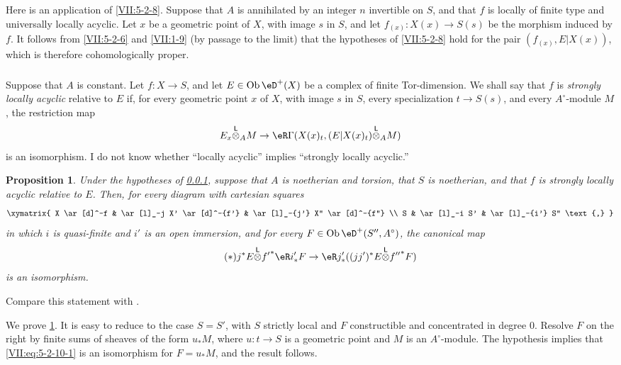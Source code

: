 \documentclass[12pt,oneside,english]{smfbook}
\DeclareMathOperator{\ob}{Ob}
\newcommand{\lotimes}{{\overset{\mathsf{L}}{\otimes}}}
\newtheorem{proposition}[subsubsection]{Proposition}
\begin{document}
Here is an application of \ref{VII:5-2-8}. Suppose that $A$ is annihilated by an integer $n$ invertible on $S$, and that $f$ is locally of finite type and universally locally acyclic. Let $x$ be a geometric point of $X$, with image $s$ in $S$, and let $f_{(x)}:X(x)\to S(s)$ be the morphism induced by $f$. It follows from \ref{VII:5-2-6} and \ref{VII:1-9} (by passage to the limit) that the hypotheses of \ref{VII:5-2-8} hold for the pair $(f_{(x)},E|X(x))$, which is therefore cohomologically proper.

\subsubsection{}\label{VII:5-2-9}

Suppose that $A$ is constant. Let $f:X\to S$, and let $E\in\ob\eD^+(X)$ be a complex of finite Tor-dimension. We shall say that $f$ is \emph{strongly locally acyclic} relative to $E$ if, for every geometric point $x$ of $X$, with image $s$ in $S$, every specialization $t\to S(s)$, and every $A^\circ$-module $M$, the restriction map
\[
  E_x\lotimes_A M \to \eR\Gamma(X(x)_t,(E|X(x)_t)\lotimes_A M)
\]
is an isomorphism. I do not know whether ``locally acyclic'' implies ``strongly locally acyclic.''

\begin{proposition}\label{VII:5-2-10}
Under the hypotheses of \ref{VII:5-2-9}, suppose that $A$ is noetherian and torsion, that $S$ is noetherian, and that $f$ is strongly locally acyclic relative to $E$. Then, for every diagram with cartesian squares
\[\xymatrix{
  X \ar[d]^-f
    & \ar[l]_-j X' \ar[d]^-{f'}
    & \ar[l]_-{j'} X'' \ar[d]^-{f''} \\
  S
    & \ar[l]_-i S'
    & \ar[l]_-{i'} S'' \text{,}
}\]
in which $i$ is quasi-finite and $i'$ is an open immersion, and for every $F\in\ob\eD^+(S'',A^\circ)$, the canonical map
\begin{equation*}\tag{$*$}\label{VII:eq:5-2-10-1}
  j^\ast E \lotimes {f'}^\ast \eR i_\ast' F \to \eR j_\ast' ((j j')^\ast E\lotimes {f''}^\ast F)
\end{equation*}
is an isomorphism.
\end{proposition}

Compare this statement with \cite[XV 1.17]{sga4}.

We prove \ref{VII:5-2-10}. It is easy to reduce to the case $S=S'$, with $S$ strictly local and $F$ constructible and concentrated in degree $0$. Resolve $F$ on the right by finite sums of sheaves of the form $u_\ast M$, where $u:t\to S$ is a geometric point and $M$ is an $A^\circ$-module. The hypothesis implies that \eqref{VII:eq:5-2-10-1} is an isomorphism for $F=u_\ast M$, and the result follows.
\clearpage
\clearpage
\end{document}
